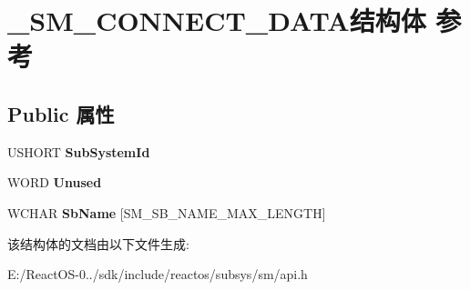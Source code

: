 \hypertarget{struct___s_m___c_o_n_n_e_c_t___d_a_t_a}{}\section{\+\_\+\+S\+M\+\_\+\+C\+O\+N\+N\+E\+C\+T\+\_\+\+D\+A\+T\+A结构体 参考}
\label{struct___s_m___c_o_n_n_e_c_t___d_a_t_a}
\subsection*{Public 属性}
\begin{DoxyCompactItemize}
\item 
\mbox{\label{struct___s_m___c_o_n_n_e_c_t___d_a_t_a_ae7b443f537ca960e97b83806df0b2fd1}} 
U\+S\+H\+O\+RT {\bfseries Sub\+System\+Id}
\item 
\mbox{\label{struct___s_m___c_o_n_n_e_c_t___d_a_t_a_a795181b285fbb0ea15a2fad2e48f6bc2}} 
W\+O\+RD {\bfseries Unused}
\item 
\mbox{\label{struct___s_m___c_o_n_n_e_c_t___d_a_t_a_a95633b4e7de0e9aca8f5ad47f4417d59}} 
W\+C\+H\+AR {\bfseries Sb\+Name} \mbox{[}S\+M\+\_\+\+S\+B\+\_\+\+N\+A\+M\+E\+\_\+\+M\+A\+X\+\_\+\+L\+E\+N\+G\+TH\mbox{]}
\end{DoxyCompactItemize}


该结构体的文档由以下文件生成\+:\begin{DoxyCompactItemize}
\item 
E\+:/\+React\+O\+S-\/0../sdk/include/reactos/subsys/sm/api.\+h\end{DoxyCompactItemize}

